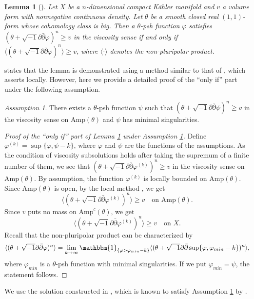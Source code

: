 \documentclass{amsart}
\numberwithin{equation}{section}
\theoremstyle{plain}
\newtheorem{lem}[equation]{Lemma}
\theoremstyle{definition}
\theoremstyle{remark}
\newtheorem{asmp}[equation]{Assumption}
\newcommand{\delb}{\sqrt{-1}\partial\bar{\partial}}
\begin{document}
\begin{lem}[{\cite[Corollary 2.6]{EGZ}}]\label{lemEGZ}
    Let $X$ be a $n$-dimensional compact K{\"a}hler manifold and $v$ a volume form with nonnegative continuous density. Let $\theta$ be a smooth closed real $(1,1)$-form whose cohomology class is big. Then a $\theta$-psh function $\varphi$ satisfies $(\theta+\delb\varphi)^n \ge v$ in the viscosity sense if and only if $\langle(\theta+\delb\varphi)^n\rangle\ge v$, where $\langle\cdot\rangle$ denotes the non-pluripolar product.
\end{lem}
\cite{EGZ} states that the lemma is demonstrated using a method similar to that of \cite[Theorem 1.9]{EGZ}, which asserts locally. However, here we provide a detailed proof of the ``only if'' part under the following assumption.
\begin{asmp}\label{asmp}
     There exists a $\theta$-psh function $\psi$ such that $(\theta+\delb \psi)^n\ge v$ in the viscosity sense on $\mathrm{Amp}(\theta)$ and $\psi$ has minimal singularities.
\end{asmp}

\begin{proof}[Proof of the ``only if'' part  of Lemma \ref{lemEGZ} under Assumption \ref{asmp}]
    Define $\varphi^{(k)}=\sup \{ \varphi, \psi-k \}$, where $\varphi$ and $\psi$ are the functions of the assumptions.  As the condition of viscosity subsolutions holds after taking the supremum of a finite number of them, we see that $(\theta+\delb{\varphi^{(k)}})^n \ge v$ in the viscosity sense on $\mathrm{Amp}(\theta)$. By assumption, the function $\varphi^{(k)}$ is locally bounded on $\mathrm{Amp}(\theta)$. Since $\mathrm{Amp}(\theta)$ is open, by the local method \cite[Theorem 1.9]{EGZ}, we get
    $$\langle(\theta+\delb\varphi^{(k)})^n\rangle\ge v \quad \text{on $\mathrm{Amp}(\theta)$}.$$
    Since $v$ puts no mass on $\mathrm{Amp}^c(\theta)$, we get
    $$\langle(\theta+\delb\varphi^{(k)})^n\rangle\ge v \quad \text{on $X$}.$$
    Recall that the non-pluripolar product can be characterized by
    $$\langle(\theta+\delb\varphi)^n\rangle = \lim_{k\rightarrow\infty}\mathbbm{1}_{\{\varphi >\varphi_{min}-k\}}\langle(\theta+\delb\sup \{ \varphi, \varphi_{min}-k \})^n\rangle,$$
    where $\varphi_{min}$ is a $\theta$-psh function with minimal singularities.
    If we put $\varphi_{min}=\psi$, the statement follows.
\end{proof}

We use the solution constructed in \cite{BEGZ}, which is known to satisfy Assumption \ref{asmp} by \cite[Theorems B and C]{BEGZ}.
\end{document}
